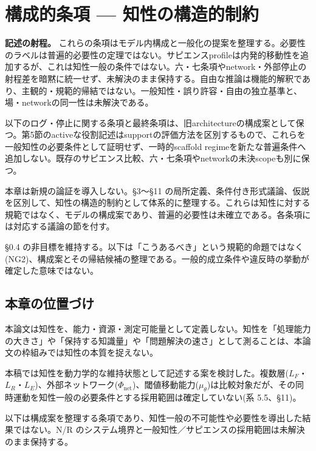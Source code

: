 \section{構成的条項 — 知性の構造的制約}

\noindent\textbf{記述の射程。} これらの条項はモデル内構成と一般化の提案を整理する。必要性のラベルは普遍的必要性の定理ではない。サピエンスprofileは内発的移動性を追加するが、これは知性一般の条件ではない。六・七条項やnetwork・外部停止の射程差を暗黙に統一せず、未解決のまま保持する。自由な推論は機能的解釈であり、主観的・規範的帰結ではない。一般知性・誤り許容・自由の独立基準と、場・networkの同一性は未解決である。

以下のログ・停止に関する条項と最終条項は、旧architectureの構成案として保つ。第5節のactiveな役割記述はsupportの評価方法を区別するもので、これらを一般知性の必要条件として証明せず、一時的scaffold regimeを新たな普遍条件へ追加しない。既存のサピエンス比較、六・七条項やnetworkの未決scopeも別に保つ。



本章は新規の論証を導入しない。\S{}3〜\S{}11 の局所定義、条件付き形式議論、仮説を区別して、知性の構造的制約として体系的に整理する。これらは知性に対する規範ではなく、モデルの構成案であり、普遍的必要性は未確立である。各条項には対応する議論の節を付す。

\S{}0.4 の非目標を維持する。以下は「こうあるべき」という規範的命題ではなく(NG2)、構成案とその帰結候補の整理である。一般的成立条件や違反時の挙動が確定した意味ではない。

\bigskip


\subsection{本章の位置づけ}


本論文は知性を、能力・資源・測定可能量として定義しない。知性を「処理能力の大きさ」や「保持する知識量」や「問題解決の速さ」として測ることは、本論文の枠組みでは知性の本質を捉えない。

本稿では知性を動力学的な維持状態として記述する案を検討した。複数層($L_F$・$L_R$・$L_E$)、外部ネットワーク($\Phi_{\text{net}}$)、閾値移動能力($\mu_\theta$)は比較対象だが、その同時運動を知性一般の必要条件とする採用範囲は確定していない(系 5.5、\S{}11)。

以下は構成案を整理する条項であり、知性一般の不可能性や必要性を導出した結果ではない。N/R のシステム境界と一般知性／サピエンスの採用範囲は未解決のまま保持する。

